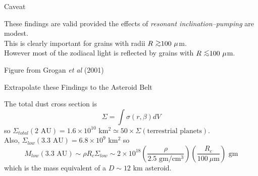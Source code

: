\documentclass[20pt,35mmSlide,landscape]{foils}
\newcommand{\gtrsim}{\mbox{ \lower0.5ex\hbox{$\sim$} \kern-1.1em 
                 \raise0.5ex\hbox{$>$}}}
\newcommand{\lesssim}{\mbox{ \lower0.5ex\hbox{$\sim$} \kern-1.1em 
                 \raise0.5ex\hbox{$<$}}}
\begin{document}
\newpage
\pagecolor{light-yellow}
\normalsize

\vspace*{-1.5in}\parbox{10in}{
\parbox[c]{4.75in}{
\begin{center}
{\large Caveat\vspace*{1ex}}
\end{center}

These findings are valid provided
the effects of {\sl resonant inclination--pumping}
are modest.\\

This is clearly important for grains
with radii $R\gtrsim100\ \mu$m.\\

However most of the zodiacal light is reflected
by grains with $R\lesssim100\ \mu$m.\\

}
\hfil\vspace*{-2in}\parbox{5.0in}{
\begin{figure}[t]
\end{figure}
\begin{center}
{\tiny Figure from Grogan {\it et al} (2001)}
\end{center}
}
}

\newpage
\pagecolor{light-yellow}
\normalsize

\vspace*{-1.3in}\begin{center}
{\large Extrapolate these Findings to the Asteroid Belt\vspace*{2ex}}
\end{center}
\noindent The total dust cross section is
\begin{displaymath}
\Sigma=\int\sigma(r,\beta)dV
\end{displaymath}
so $\Sigma_{total}(\mbox{2 AU})=1.6\times10^{10}$ km$^2\simeq
50\times\Sigma(\mbox{terrestrial planets})$.\\

\noindent Also, $\Sigma_{low}(\mbox{3.3 AU})=6.8\times10^{9}$ km$^2$ so
\begin{displaymath}
M_{low}(\mbox{3.3 AU})\sim\rho R_c\Sigma_{low}\sim
2\times10^{18}\left(\frac{\rho}{\mbox{2.5 gm/cm$^3$}}\right)
\left(\frac{R_c}{100\ \mu\mbox{m}}\right)\mbox{ gm}
\end{displaymath}
which is the mass equivalent of a $D\sim12$ km asteroid.
\end{document}
